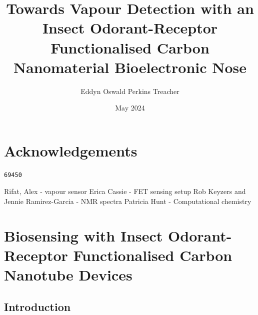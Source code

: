 \documentclass[
  a4paper,
]{scrbook}
\title{Towards Vapour Detection with an Insect Odorant-Receptor
Functionalised Carbon Nanomaterial Bioelectronic Nose}
\author{Eddyn Oswald Perkins Treacher}
\date{May 2024}
\renewcommand*\contentsname{Table of contents}
\newcommand\contentsname{Table of contents}
\begin{document}
\frontmatter
\maketitle
\ifdefined\Shaded\renewenvironment{Shaded}{\begin{tcolorbox}[frame hidden, enhanced, boxrule=0pt, borderline west={3pt}{0pt}{shadecolor}, breakable, sharp corners, interior hidden]}{\end{tcolorbox}}\fi

\renewcommand*\contentsname{Table of contents}
{
\setcounter{tocdepth}{2}
\tableofcontents
}
\mainmatter
{}

\hypertarget{acknowledgements}{%
\chapter*{Acknowledgements}\label{acknowledgements}}


\begin{verbatim}
69450
\end{verbatim}

Rifat, Alex - vapour sensor Erica Cassie - FET sensing setup Rob Keyzers
and Jennie Ramirez-Garcia - NMR spectra Patricia Hunt - Computational
chemistry


\hypertarget{biosensing-with-insect-odorant-receptor-functionalised-carbon-nanotube-devices}{%
\chapter{Biosensing with Insect Odorant-Receptor Functionalised Carbon
Nanotube
Devices}\label{biosensing-with-insect-odorant-receptor-functionalised-carbon-nanotube-devices}}

\hypertarget{introduction}{%
\section{Introduction}\label{introduction}}
\end{document}
